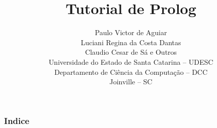 \documentclass[sans]{beamer}
\title[Tutorial de Prolog]{Tutorial de Prolog}
\author[Paulo, Claudio, Lu]{Paulo Victor de Aguiar\\
	Luciani Regina da Costa Dantas\\
	Claudio Cesar de Sá e Outros\\ 
	Universidade do Estado de Santa Catarina -- UDESC\\
	Departamento de Ciência da Computação -- DCC\\
	Joinville -- SC}
\begin{document}
\begin{frame}[fragile]   %
\maketitle
\end{frame}

\begin{frame}[fragile]   %
\frametitle{Indice}
\tableofcontents
\end{frame}
\end{document}
